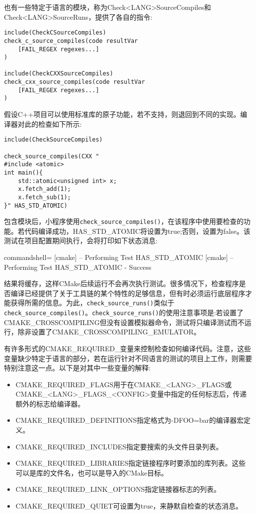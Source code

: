 也有一些特定于语言的模块，称为Check<LANG>SourceCompiles和Check<LANG>SourceRuns，提供了各自的指令:

\begin{lstlisting}[style=styleCMake]
include(CheckCSourceCompiles)
check_c_source_compiles(code resultVar
	[FAIL_REGEX regexes...]
)

include(CheckCXXSourceCompiles)
check_cxx_source_compiles(code resultVar
	[FAIL_REGEX regexes...]
)
\end{lstlisting}

假设C++项目可以使用标准库的原子功能，若不支持，则退回到不同的实现。编译器对此的检查如下所示:

\begin{lstlisting}[style=styleCMake]
include(CheckSourceCompiles)

check_source_compiles(CXX "
#include <atomic>
int main(){
	std::atomic<unsigned int> x;
	x.fetch_add(1);
	x.fetch_sub(1);
}" HAS_STD_ATOMIC)
\end{lstlisting}

包含模块后，小程序使用\texttt{check\_source\_compiles()}，在该程序中使用要检查的功能。若代码编译成功，HAS\_STD\_ATOMIC将设置为true;否则，设置为false。该测试在项目配置期间执行，会将打印如下状态消息:

\begin{tcblisting}{commandshell={}}
[cmake] -- Performing Test HAS_STD_ATOMIC
[cmake] -- Performing Test HAS_STD_ATOMIC - Success
\end{tcblisting}

结果将缓存，这样CMake后续运行不会再次执行测试。很多情况下，检查程序是否编译已经提供了关于工具链的某个特性的足够信息，但有时必须运行底层程序才能获得所需的信息。为此，\texttt{check\_source\_runs()}类似于\texttt{check\_source\_compiles()}。\texttt{check\_source\_runs()}的使用注意事项是:若设置了CMAKE\_CROSSCOMPILING但没有设置模拟器命令，测试将只编译测试而不运行，除非设置了CMAKE\_CROSSCOMPILING\_EMULATOR。

有许多形式的CMAKE\_REQUIRED\_变量来控制检查如何编译代码。注意，这些变量缺少特定于语言的部分，若在运行针对不同语言的测试的项目上工作，则需要特别注意这一点。以下是对其中一些变量的解释:

\begin{itemize}
\item 
CMAKE\_REQUIRED\_FLAGS用于在CMAKE\_<LANG>\_FLAGS或CMAKE\_<LANG>\_FLAGS\_<CONFIG>变量中指定的任何标志后，传递额外的标志给编译器。

\item 
CMAKE\_REQUIRED\_DEFINITIONS指定格式为-DFOO=bar的编译器宏定义。

\item 
CMAKE\_REQUIRED\_INCLUDES指定要搜索的头文件目录列表。

\item 
CMAKE\_REQUIRED\_LIBRARIES指定链接程序时要添加的库列表。这些可以是库的文件名，也可以是导入的CMake目标。

\item 
CMAKE\_REQUIRED\_LINK\_OPTIONS指定链接器标志的列表。

\item
CMAKE\_REQUIRED\_QUIET可设置为true，来静默自检查的状态消息。
\end{itemize}

